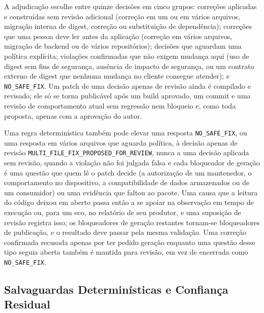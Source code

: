 \documentclass[conference]{IEEEtran}
\begin{document}
A adjudicação escolhe entre quinze decisões em cinco grupos: correções
aplicadas e construídas sem revisão adicional (correção em um ou em vários
arquivos, migração interna de digest, correção ou substituição de dependência);
correções que uma pessoa deve ler antes da aplicação (correção em vários
arquivos, migração de backend ou de vários repositórios); decisões que aguardam
uma política explícita; violações confirmadas que não exigem mudança aqui (uso
de digest sem fins de segurança, ausência de impacto de segurança, ou um
contrato externo de digest que nenhuma mudança no cliente consegue atender); e
\texttt{NO\_SAFE\_FIX}. Um patch de uma decisão apenas de revisão
ainda é compilado e revisado; ele só se torna publicável após um build aprovado,
um commit e uma revisão de comportamento atual sem regressão nem bloqueio e, como
toda proposta, apenas com a aprovação do autor.

Uma regra determinística também pode elevar uma resposta \texttt{NO\_SAFE\_FIX},
ou uma resposta em vários arquivos que aguarda política, à decisão apenas de
revisão \texttt{MULTI\_FILE\_FIX\_}\allowbreak\texttt{PROPOSED\_FOR\_REVIEW},
nunca a uma decisão aplicada sem revisão, quando a violação não foi julgada
falsa e cada bloqueador de geração é uma questão que quem lê o patch decide (a
autorização de um mantenedor, o comportamento no dispositivo, a compatibilidade
de dados armazenados ou de um consumidor) ou uma evidência que faltou ao
pacote. Uma causa que a leitura do código deixou em aberto passa então a se
apoiar na observação em tempo de execução ou, para um eco, no relatório de seu
produtor, e uma suposição de revisão registra isso; os bloqueadores de geração
restantes tornam-se bloqueadores de publicação, e o resultado deve passar pela
mesma validação. Uma correção confirmada recusada apenas por ter pedido geração
enquanto uma questão desse tipo seguia aberta também é mantida para revisão, em
vez de encerrada como \texttt{NO\_SAFE\_FIX}.

\subsection{Salvaguardas Determinísticas e Confiança Residual}
\end{document}
